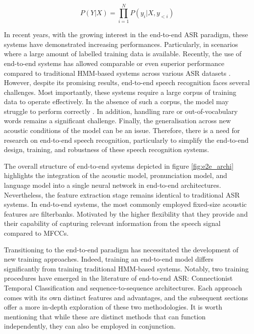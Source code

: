 \begin{equation}
     P(Y|X) = \prod_{i=1}^{N}P(y_i | X,y_{<i})
 \end{equation}

 In recent years, with the growing interest in the end-to-end \ac{ASR} paradigm, these systems have demonstrated increasing performances. Particularly, in scenarios where a large amount of labelled training data is available. Recently, the use of end-to-end systems has allowed comparable or even superior performance compared to traditional \ac{HMM}-based systems across various \ac{ASR} datasets \cite{hannun2014deep,hmmvse2e}. However, despite its promising results, end-to-end speech recognition faces several challenges. Most importantly, these systems require a large corpus of training data to operate effectively. In the absence of such a corpus, the model may struggle to perform correctly \cite{hmm-end2end}. In addition, handling rare or out-of-vocabulary words remains a significant challenge. Finally, the generalisation across new acoustic conditions of the model can be an issue. Therefore, there is a need for research on end-to-end speech recognition, particularly to simplify the end-to-end design, training, and robustness of these speech recognition systems.
 
 The overall structure of end-to-end systems depicted in figure \ref{fig:e2e_archi} highlights the integration of the acoustic model, pronunciation model, and language model into a single neural network in end-to-end architectures. Nevertheless, the feature extraction stage remains identical to traditional \ac{ASR} systems. In end-to-end systems, the most commonly employed fixed-size acoustic features are filterbanks. Motivated by the higher flexibility that they provide and their capability of capturing relevant information from the speech signal compared to \acp{MFCC}.

 Transitioning to the end-to-end paradigm has necessitated the development of new training approaches. Indeed, training an end-to-end model differs significantly from training traditional \ac{HMM}-based systems. Notably, two training procedures have emerged in the literature of end-to-end \ac{ASR}: Connectionist Temporal Classification and sequence-to-sequence architectures. Each approach comes with its own distinct features and advantages, and the subsequent sections offer a more in-depth exploration of these two methodologies. It is worth mentioning that while these are distinct methods that can function independently, they can also be employed in conjunction.
 
